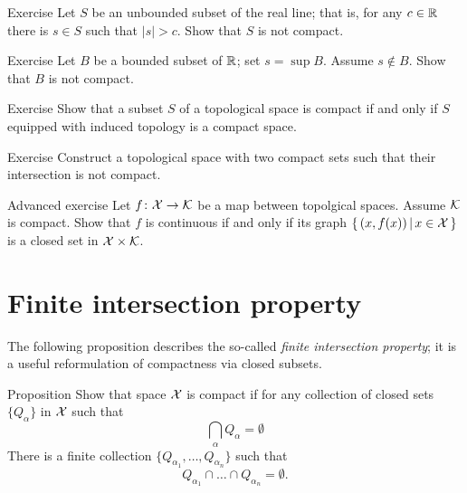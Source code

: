 \begin{thm}{Exercise}
Let $S$ be an unbounded subset of the real line; that is, for any $c\in \mathbb{R}$ there is $s\in S$ such that $|s|>c$.
Show that $S$ is not compact.

\end{thm}

\begin{thm}{Exercise}
Let $B$ be a bounded subset of $\mathbb{R}$; set $s=\sup B$.
Assume $s\notin B$.
Show that $B$ is not compact.

\end{thm}

\begin{thm}{Exercise}
Show that a subset $S$ of a topological space is compact if and only if $S$ equipped with induced topology is a compact space.
\end{thm}

\begin{thm}{Exercise}
Construct a topological space with two compact sets such that their intersection is not compact.
\end{thm}

\begin{thm}{Advanced exercise} Let $f\colon\mathcal{X}\to\mathcal{K}$ be a map between topolgical spaces.
Assume $\mathcal{K}$ is compact.
Show that $f$ is continuous if and only if its graph $\left\{\,{(x,f(x))}\,\middle|\,{x\in\mathcal{X}}\,\right\}$ is a closed set in $\mathcal{X}\times\mathcal{K}$. 
\end{thm}

\section{Finite intersection property}

The following proposition describes the so-called \emph{finite intersection property};
it is a useful reformulation of compactness via closed subsets. 

\begin{thm}{Proposition}
Show that space $\mathcal{X}$ is compact if for any collection of closed sets $\{Q_\alpha\}$ in $\mathcal{X}$ such that 
\[\bigcap_{\alpha}Q_\alpha=\emptyset\]
There is a finite collection $\{Q_{\alpha_1},\dots,Q_{\alpha_n}\}$
such that
\[Q_{\alpha_1}\cap\dots\cap Q_{\alpha_n}=\emptyset.\]

\end{thm}

